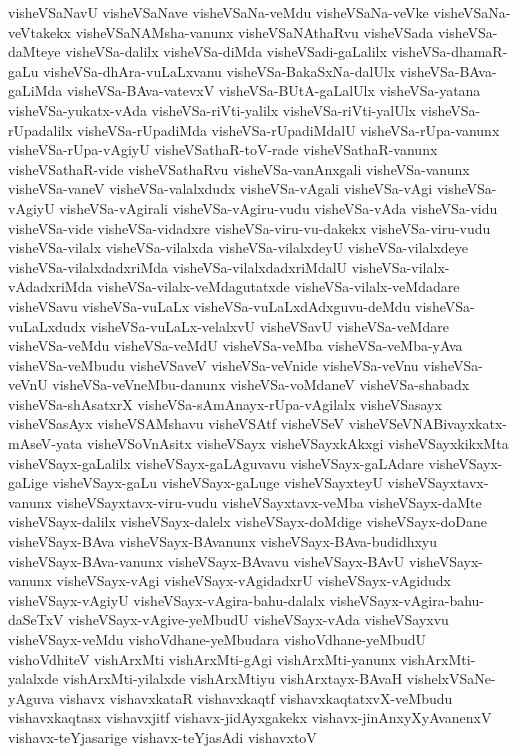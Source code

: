 {visheVSaNavU
visheVSaNave
visheVSaNa-veMdu
visheVSaNa-veVke
visheVSaNa-veVtakekx
visheVSaNAMsha-vanunx
visheVSaNAthaRvu
visheVSada
visheVSa-daMteye
visheVSa-dalilx
visheVSa-diMda
visheVSadi-gaLalilx
visheVSa-dhamaR-gaLu
visheVSa-dhAra-vuLaLxvanu
visheVSa-BakaSxNa-dalUlx
visheVSa-BAva-gaLiMda
visheVSa-BAva-vatevxV
visheVSa-BUtA-gaLalUlx
visheVSa-yatana
visheVSa-yukatx-vAda
visheVSa-riVti-yalilx
visheVSa-riVti-yalUlx
visheVSa-rUpadalilx
visheVSa-rUpadiMda
visheVSa-rUpadiMdalU
visheVSa-rUpa-vanunx
visheVSa-rUpa-vAgiyU
visheVSathaR-toV-rade
visheVSathaR-vanunx
visheVSathaR-vide
visheVSathaRvu
visheVSa-vanAnxgali
visheVSa-vanunx
visheVSa-vaneV
visheVSa-valalxdudx
visheVSa-vAgali
visheVSa-vAgi
visheVSa-vAgiyU
visheVSa-vAgirali
visheVSa-vAgiru-vudu
visheVSa-vAda
visheVSa-vidu
visheVSa-vide
visheVSa-vidadxre
visheVSa-viru-vu-dakekx
visheVSa-viru-vudu
visheVSa-vilalx
visheVSa-vilalxda
visheVSa-vilalxdeyU
visheVSa-vilalxdeye
visheVSa-vilalxdadxriMda
visheVSa-vilalxdadxriMdalU
visheVSa-vilalx-vAdadxriMda
visheVSa-vilalx-veMdagutatxde
visheVSa-vilalx-veMdadare
visheVSavu
visheVSa-vuLaLx
visheVSa-vuLaLxdAdxguvu-deMdu
visheVSa-vuLaLxdudx
visheVSa-vuLaLx-velalxvU
visheVSavU
visheVSa-veMdare
visheVSa-veMdu
visheVSa-veMdU
visheVSa-veMba
visheVSa-veMba-yAva
visheVSa-veMbudu
visheVSaveV
visheVSa-veVnide
visheVSa-veVnu
visheVSa-veVnU
visheVSa-veVneMbu-danunx
visheVSa-voMdaneV
visheVSa-shabadx
visheVSa-shAsatxrX
visheVSa-sAmAnayx-rUpa-vAgilalx
visheVSasayx
visheVSasAyx
visheVSAMshavu
visheVSAtf
visheVSeV
visheVSeVNABivayxkatx-mAseV-yata
visheVSoVnAsitx
visheVSayx
visheVSayxkAkxgi
visheVSayxkikxMta
visheVSayx-gaLalilx
visheVSayx-gaLAguvavu
visheVSayx-gaLAdare
visheVSayx-gaLige
visheVSayx-gaLu
visheVSayx-gaLuge
visheVSayxteyU
visheVSayxtavx-vanunx
visheVSayxtavx-viru-vudu
visheVSayxtavx-veMba
visheVSayx-daMte
visheVSayx-dalilx
visheVSayx-dalelx
visheVSayx-doMdige
visheVSayx-doDane
visheVSayx-BAva
visheVSayx-BAvanunx
visheVSayx-BAva-budidhxyu
visheVSayx-BAva-vanunx
visheVSayx-BAvavu
visheVSayx-BAvU
visheVSayx-vanunx
visheVSayx-vAgi
visheVSayx-vAgidadxrU
visheVSayx-vAgidudx
visheVSayx-vAgiyU
visheVSayx-vAgira-bahu-dalalx
visheVSayx-vAgira-bahu-daSeTxV
visheVSayx-vAgive-yeMbudU
visheVSayx-vAda
visheVSayxvu
visheVSayx-veMdu
vishoVdhane-yeMbudara
vishoVdhane-yeMbudU
vishoVdhiteV
vishArxMti
vishArxMti-gAgi
vishArxMti-yanunx
vishArxMti-yalalxde
vishArxMti-yilalxde
vishArxMtiyu
vishArxtayx-BAvaH
vishelxVSaNe-yAguva
vishavx
vishavxkataR
vishavxkaqtf
vishavxkaqtatxvX-veMbudu
vishavxkaqtasx
vishavxjitf
vishavx-jidAyxgakekx
vishavx-jinAnxyXyAvanenxV
vishavx-teYjasarige
vishavx-teYjasAdi
vishavxtoV
}
